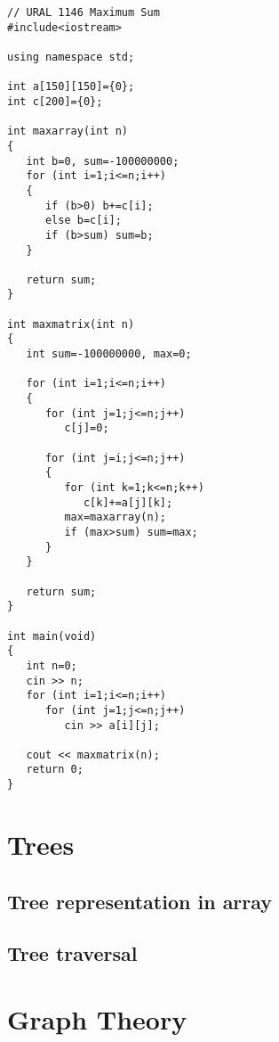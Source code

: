 \documentclass[a4paper]{article}
\begin{document}
\begin{verbatim}
// URAL 1146 Maximum Sum
#include<iostream>

using namespace std;

int a[150][150]={0};
int c[200]={0};

int maxarray(int n)
{
   int b=0, sum=-100000000;
   for (int i=1;i<=n;i++)
   {
      if (b>0) b+=c[i];
      else b=c[i];
      if (b>sum) sum=b;
   }
   
   return sum;
}

int maxmatrix(int n)
{
   int sum=-100000000, max=0;
   
   for (int i=1;i<=n;i++)
   {
      for (int j=1;j<=n;j++)
         c[j]=0;
      
      for (int j=i;j<=n;j++)
      {
         for (int k=1;k<=n;k++)
            c[k]+=a[j][k];
         max=maxarray(n);
         if (max>sum) sum=max;
      }
   }
   
   return sum;
}

int main(void)
{
   int n=0;
   cin >> n;
   for (int i=1;i<=n;i++)
      for (int j=1;j<=n;j++)
         cin >> a[i][j];
   
   cout << maxmatrix(n);
   return 0;
}
\end{verbatim}

\section{Trees}

\subsection{Tree representation in array}

\subsection{Tree traversal}

\section{Graph Theory}
\end{document}
